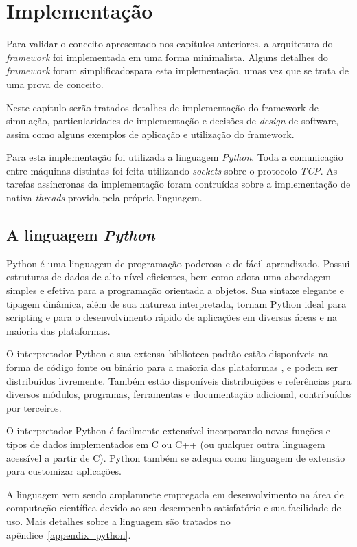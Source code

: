 \chapter{Implementação}

Para validar o conceito apresentado nos capítulos anteriores, a arquitetura do \textit{framework} foi implementada em uma forma minimalista. Alguns detalhes do \textit{framework} foram simplificadospara esta implementação, umas vez que se trata de uma prova de conceito.

Neste capítulo serão tratados detalhes de implementação do framework de simulação, particularidades de implementação e decisões de \textit{design} de software, assim como alguns exemplos de aplicação e utilização do framework.

Para esta implementação foi utilizada a linguagem \textit{Python}. Toda a comunicação entre máquinas distintas foi feita utilizando \textit{sockets} sobre o protocolo \textit{TCP}. As tarefas assíncronas da implementação foram contruídas sobre a implementação de nativa \textit{threads} provida pela própria linguagem.

\section{A linguagem \emph{Python}}

Python é uma linguagem de programação poderosa e de fácil aprendizado. Possui estruturas de dados de alto nível eficientes, bem como adota uma abordagem simples e efetiva para a programação orientada a objetos. Sua sintaxe elegante e tipagem dinâmica, além de sua natureza interpretada, tornam Python ideal para scripting e para o desenvolvimento rápido de aplicações em diversas áreas e na maioria das plataformas.

O interpretador Python e sua extensa biblioteca padrão estão disponíveis na forma de código fonte ou binário para a maioria das plataformas \cite{PYTHONSITE}, e podem ser distribuídos livremente. Também estão disponíveis distribuições e referências para diversos módulos, programas, ferramentas e documentação adicional, contribuídos por terceiros.

O interpretador Python é facilmente extensível incorporando novas funções e tipos de dados implementados em C ou C++ (ou qualquer outra linguagem acessível a partir de C). Python também se adequa como linguagem de extensão para customizar aplicações.

A linguagem vem sendo amplamnete empregada em desenvolvimento na área de computação científica devido ao seu desempenho satisfatório e sua facilidade de uso. Mais detalhes sobre a linguagem são tratados no apêndice~\ref{appendix_python}.

